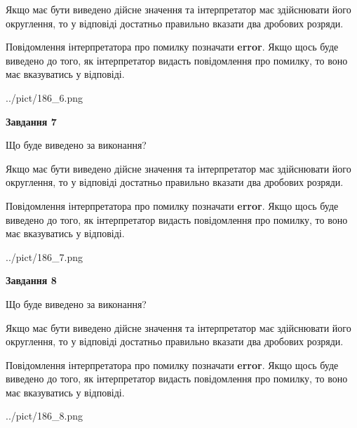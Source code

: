 \documentclass[12pt, ukrainian]{article}
\begin{document}
{\begin {Large}
Якщо має бути виведено дійсне значення та інтерпретатор має здійснювати його округлення, 
то у відповіді достатньо правильно вказати два дробових розряди.

Повідомлення інтерпретатора про помилку позначати \textbf{error}.
Якщо щось буде виведено до того, як інтерпретатор видасть повідомлення про помилку, 
то воно має вказуватись у відповіді. \par

\begin{center}
	{../pict/186_6.png}
\end{center}
\newpage

{\begin {center}\textbf{Завдання 7}\end {center}}\par
Що буде виведено за виконання? \par

Якщо має бути виведено дійсне значення та інтерпретатор має здійснювати його округлення, 
то у відповіді достатньо правильно вказати два дробових розряди.

Повідомлення інтерпретатора про помилку позначати \textbf{error}.
Якщо щось буде виведено до того, як інтерпретатор видасть повідомлення про помилку, 
то воно має вказуватись у відповіді. \par

\begin{center}
	{../pict/186_7.png}
\end{center}
\newpage

{\begin {center}\textbf{Завдання 8}\end {center}}\par
Що буде виведено за виконання? \par

Якщо має бути виведено дійсне значення та інтерпретатор має здійснювати його округлення, 
то у відповіді достатньо правильно вказати два дробових розряди.

Повідомлення інтерпретатора про помилку позначати \textbf{error}.
Якщо щось буде виведено до того, як інтерпретатор видасть повідомлення про помилку, 
то воно має вказуватись у відповіді. \par

\begin{center}
	{../pict/186_8.png}
\end{center}
\newpage


\end{Large}}
\end{document}
